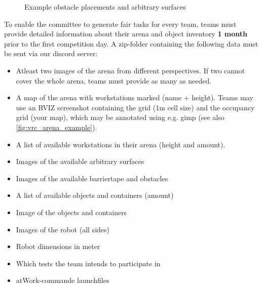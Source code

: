 \begin{figure} [h!]
\begin{center}
 \hspace{1cm}
\end{center}
\caption{Example obstacle placements and arbitrary surfaces}
\label{fig:vrc_obst_arbi}
\end{figure}


To enable the committee to generate fair tasks for every team, teams must provide detailed information about their arena and object inventory \textbf{1 month} prior to the first competition day. A zip-folder containing the following data must be sent via our discord server:

\begin{itemize}
\item Atleast two images of the arena from different perspectives. If two cannot cover the whole arena, teams must provide as many as needed.
\item A map of the arena with workstations marked (name + height). Teams may use an RVIZ screenshot containing the grid (1m cell size) and the occupancy grid (your map), which may be annotated using e.g. gimp (see also \ref{fig:vrc_arena_example}).
\item A list of available workstations in their arena (height and amount).
\item Images of the available arbitrary surfaces
\item Images of the available barriertape and obstacles
\item A list of available objects and containers (amount)
\item Image of the objects and containers
\item Images of the robot (all sides)
\item Robot dimensions in meter
\item Which tests the team intends to participate in
\item atWork-commande launchfiles
\end{itemize}

